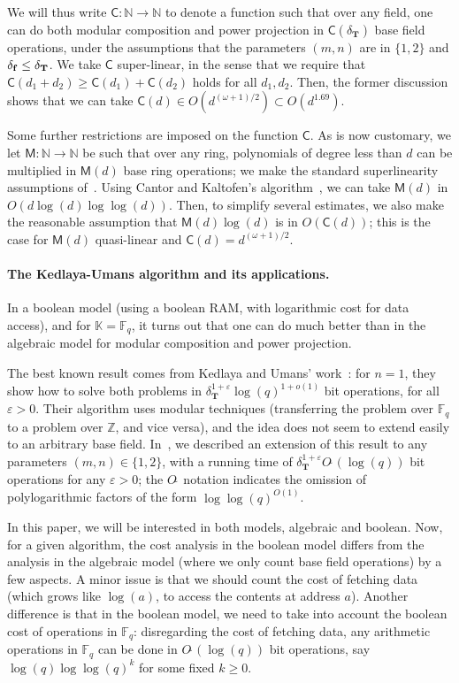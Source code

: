 \documentclass[12pt]{article}
\def\CC {\ensuremath{\mathsf{C}}}
\def\N {\ensuremath{\mathbb{N}}}
\def\Z {\ensuremath{\mathbb{Z}}}
\def\F {\ensuremath{\mathbb{F}}}
\def\K {\ensuremath{\mathbb{K}}}
\def\M {\ensuremath{\mathsf{M}}}
\def\Tt {\ensuremath{\mathbf{T}}}
\def\Ot {O\tilde{~}}
\begin{document}
We will thus write $\CC:\N \to \N$ to denote a function such that over
any field, one can do both modular composition and power projection in
$\CC(\delta_\Tt)$ base field operations, under the assumptions that
the parameters $(m,n)$ are in $\{1,2\}$ and $\delta_{\bf f} \le
\delta_\Tt$.  We take $\CC$ super-linear, in the sense that we require
that $\CC(d_1 + d_2) \ge \CC(d_1)+\CC(d_2)$ holds for all
$d_1,d_2$. Then, the former discussion shows that we can take $\CC(d)
\in O(d^{(\omega+1)/2}) \subset O(d^{1.69})$.

Some further restrictions are imposed on the function $\CC$. As is now
customary, we let $\M:\N \to \N$ be such that over any ring,
polynomials of degree less than $d$ can be multiplied in $\M(d)$ base
ring operations; we make the standard superlinearity assumptions
of~\cite[Chapter~8]{GaGe03}. Using Cantor and Kaltofen's
algorithm~\cite{CaKa91}, we can take $\M(d)$ in $O(d \log(d)
\log\log(d))$. Then, to simplify several estimates, we also make the
reasonable assumption that $\M(d)\log(d)$ is in $O(\CC(d))$; this is
the case for $\M(d)$ quasi-linear and $\CC(d)=d^{(\omega+1)/2}$.

\paragraph{The Kedlaya-Umans algorithm and its applications.}
In a boolean model (using a boolean RAM, with logarithmic cost for
data access), and for $\K=\F_q$, it turns out that one can do much
better than in the algebraic model for modular composition and power
projection.

The best known result comes from Kedlaya and Umans'
work~\cite{KeUm10}: for $n=1$, they show how to solve both problems in
$\delta_\Tt^{1+\varepsilon}\log(q)^{1+o(1)}$ bit operations, for all
$\varepsilon > 0$. Their algorithm uses modular techniques
(transferring the problem over $\F_q$ to a problem over $\Z$, and vice
versa), and the idea does not seem to extend easily to an arbitrary
base field. In~\cite{PoSc10}, we described an extension of this result
to any parameters $(m,n) \in \{1,2\}$, with a running time of
$\delta_\Tt^{1+\varepsilon}\Ot(\log(q))$ bit operations for any
$\varepsilon > 0$; the $\Ot$ notation indicates the omission of
polylogarithmic factors of the form $\log\log(q)^{O(1)}$.

In this paper, we will be interested in both models, algebraic and
boolean. Now, for a given algorithm, the cost analysis in the boolean
model differs from the analysis in the algebraic model (where we only
count base field operations) by a few aspects. A minor issue is that
we should count the cost of fetching data (which grows like $\log(a)$,
to access the contents at address $a$). Another difference is that in
the boolean model, we need to take into account the boolean cost of
operations in $\F_q$: disregarding the cost of fetching data, any
arithmetic operations in $\F_q$ can be done in $O\tilde{~}(\log(q))$
bit operations, say $\log(q)\log\log(q)^k$ for some fixed $k\ge 0$.
\end{document}
